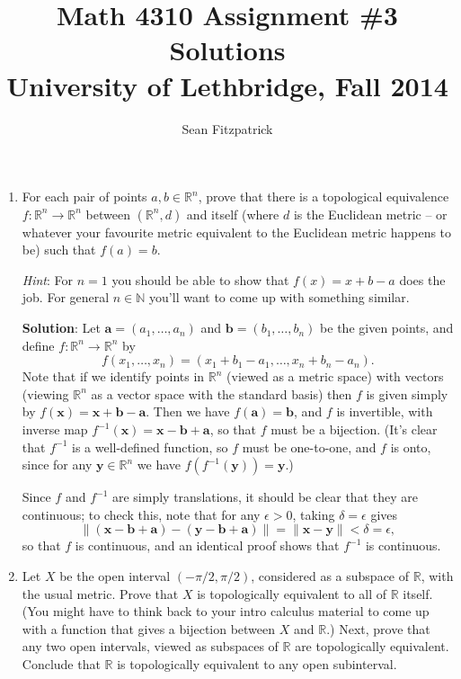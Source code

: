 \documentclass[letterpaper,12pt]{article}
\title{Math 4310 Assignment \#3 Solutions\\University of Lethbridge, Fall 2014}
\author{Sean Fitzpatrick}
\newcommand{\len}[1]{\lVert #1\rVert}
\newcommand{\R}{\mathbb{R}}
\newcommand{\x}{\mathbf{x}}
\newcommand{\y}{\mathbf{y}}
\newcommand{\aaa}{\mathbf{a}}
\newcommand{\bbb}{\mathbf{b}}
\begin{document}
 \maketitle

\begin{enumerate}
\item For each pair of points $a,b\in\mathbb{R}^n$, prove that there is a topological equivalence $f:\R^n\to \R^n$ between $(\R^n,d)$ and itself (where $d$ is the Euclidean metric -- or whatever your favourite metric equivalent to the Euclidean metric happens to be) such that $f(a)=b$.

{\em Hint}: For $n=1$ you should be able to show that $f(x)=x+b-a$ does the job. For general $n\in\mathbb{N}$ you'll want to come up with something similar.

\bigskip

{\bf Solution}: Let $\aaa=(a_1,\ldots, a_n)$ and $\bbb=(b_1,\ldots, b_n)$ be the given points, and define $f:\R^n\to\R^n$ by
\[
f(x_1,\ldots, x_n) = (x_1+b_1-a_1,\ldots, x_n+b_n-a_n).
\]
Note that if we identify points in $\R^n$ (viewed as a metric space) with vectors (viewing $\R^n$ as a vector space with the standard basis) then $f$ is given simply by $f(\x) = \x+\bbb-\aaa$. Then we have $f(\aaa)=\bbb$, and $f$ is invertible, with inverse map $f^{-1}(\x) = \x-\bbb+\aaa$, so that $f$ must be a bijection. (It's clear that $f^{-1}$ is a well-defined function, so $f$ must be one-to-one, and $f$ is onto, since for any $\y\in\R^n$ we have $f(f^{-1}(\y))=\y$.)

Since $f$ and $f^{-1}$ are simply translations, it should be clear that they are continuous; to check this, note that for any $\epsilon>0$, taking $\delta=\epsilon$ gives
\[
\len{(\x-\bbb+\aaa)-(\y-\bbb+\aaa)} = \len{\x-\y}<\delta=\epsilon,
\]
so that $f$ is continuous, and an identical proof shows that $f^{-1}$ is continuous.

\item Let $X$ be the open interval $(-\pi/2,\pi/2)$, considered as a subspace of $\R$, with the usual metric. Prove that $X$ is topologically equivalent to all of $\R$ itself. (You might have to think back to your intro calculus material to come up with a function that gives a bijection between $X$ and $\R$.) Next, prove that any two open intervals, viewed as subspaces of $\R$ are topologically equivalent. Conclude that $\R$ is topologically equivalent to any open subinterval.

\bigskip


\end{enumerate}
\end{document}
